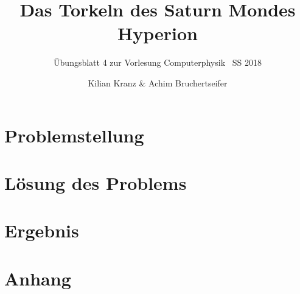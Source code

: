 \documentclass[12pt,a4paper,titlepage]{scrreprt}
\author{Kilian Kranz \& Achim Bruchertseifer}
\title{Das Torkeln des Saturn Mondes Hyperion}
\subtitle{Übungsblatt 4 zur Vorlesung \glqq Computerphysik\grqq~ SS 2018}
\begin{document}
	\maketitle
	\setcounter{chapter}{4}

	\section{Problemstellung}
	
	
	\section{Lösung des Problems}
	
	
	\section{Ergebnis}

	\section{Anhang}

	
\end{document}
